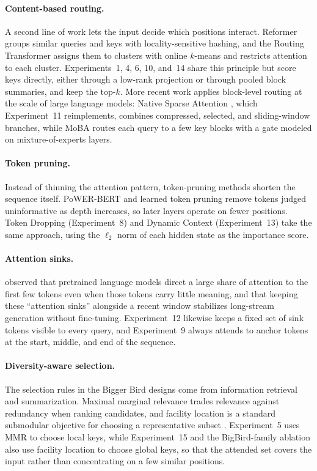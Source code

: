 \documentclass[11pt]{article}
\begin{document}
\paragraph{Content-based routing.}
A second line of work lets the input decide which positions interact.
Reformer \citep{kitaev2020reformer} groups similar queries and keys with
locality-sensitive hashing, and the Routing Transformer
\citep{roy2021routing} assigns them to clusters with online $k$-means and
restricts attention to each cluster. Experiments~1, 4, 6, 10, and~14 share
this principle but score keys directly, either through a low-rank projection
or through pooled block summaries, and keep the top-$k$. More recent work
applies block-level routing at the scale of large language models: Native
Sparse Attention \citep{yuan2025nsa}, which Experiment~11 reimplements,
combines compressed, selected, and sliding-window branches, while MoBA
\citep{lu2025moba} routes each query to a few key blocks with a gate modeled
on mixture-of-experts layers.

\paragraph{Token pruning.}
Instead of thinning the attention pattern, token-pruning methods shorten the
sequence itself. PoWER-BERT \citep{goyal2020powerbert} and learned token
pruning \citep{kim2021tokenpruning} remove tokens judged uninformative as
depth increases, so later layers operate on fewer positions. Token Dropping
(Experiment~8) and Dynamic Context (Experiment~13) take the same approach,
using the $\ell_2$ norm of each hidden state as the importance score.

\paragraph{Attention sinks.}
\citet{xiao2024streamingllm} observed that pretrained language models direct
a large share of attention to the first few tokens even when those tokens
carry little meaning, and that keeping these ``attention sinks'' alongside a
recent window stabilizes long-stream generation without fine-tuning.
Experiment~12 likewise keeps a fixed set of sink tokens visible to every
query, and Experiment~9 always attends to anchor tokens at the start, middle,
and end of the sequence.

\paragraph{Diversity-aware selection.}
The selection rules in the Bigger Bird designs come from information
retrieval and summarization. Maximal marginal relevance \citep{carbonell1998mmr}
trades relevance against redundancy when ranking candidates, and facility
location is a standard submodular objective for choosing a representative
subset \citep{lin2011submodular}. Experiment~5 uses MMR to choose local keys,
while Experiment~15 and the BigBird-family ablation also use facility location
to choose global keys, so that the attended set covers the input rather than
concentrating on a few similar positions.
\end{document}
